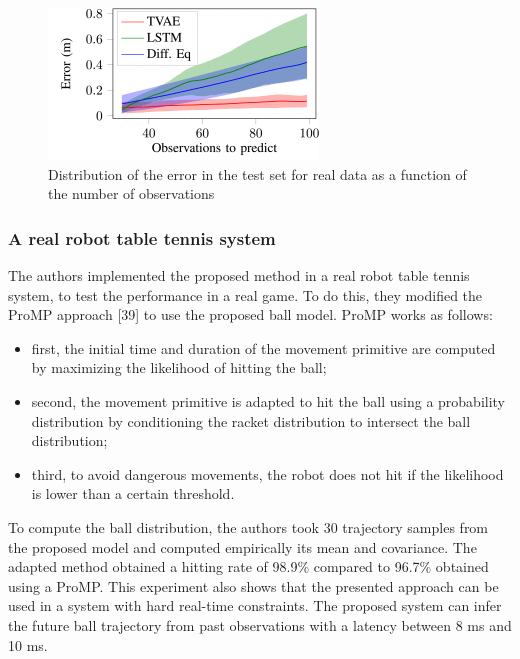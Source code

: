 \begin{figure}[h!]
\centering
\includegraphics[width=0.37\linewidth]{images/accuracyballresreal.png}
\caption{Distribution of the error in the test set for real data as a function of the number of observations}
\end{figure}

\subsubsection{A real robot table tennis system}\label{header-n978}

The authors implemented the proposed method in a real robot table tennis
system, to test the performance in a real game. To do this, they
modified the ProMP approach {[}39{]} to use the proposed ball model.
ProMP works as follows:

\begin{itemize}
\item
  first, the initial time and duration of the movement primitive are
  computed by maximizing the likelihood of hitting the ball;
\item
  second, the movement primitive is adapted to hit the ball using a
  probability distribution by conditioning the racket distribution to
  intersect the ball distribution;
\item
  third, to avoid dangerous movements, the robot does not hit if the
  likelihood is lower than a certain threshold.
\end{itemize}

To compute the ball distribution, the authors took 30 trajectory samples
from the proposed model and computed empirically its mean and
covariance. The adapted method obtained a hitting rate of 98.9\%
compared to 96.7\% obtained using a ProMP. This experiment also shows
that the presented approach can be used in a system with hard real-time
constraints. The proposed system can infer the future ball trajectory
from past observations with a latency between 8 ms and 10 ms.